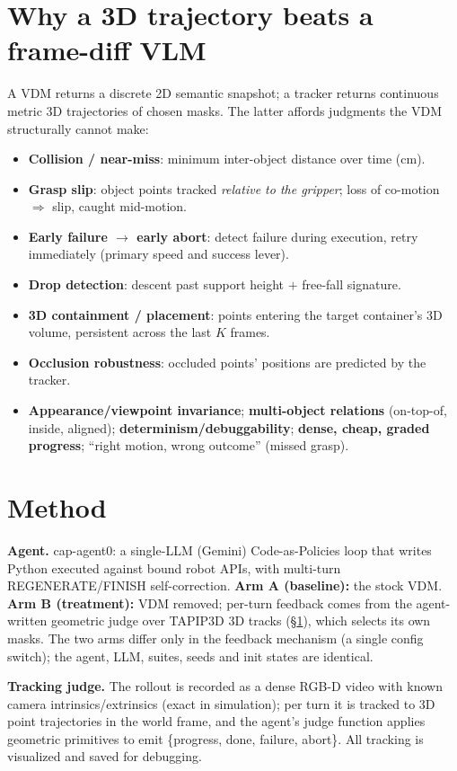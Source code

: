 \documentclass[11pt]{article}
\begin{document}
\section{Why a 3D trajectory beats a frame-diff VLM}
\label{sec:why}
A VDM returns a discrete 2D semantic snapshot; a tracker returns continuous metric 3D
trajectories of chosen masks. The latter affords judgments the VDM structurally cannot make:
\begin{itemize}\itemsep2pt
  \item \textbf{Collision / near-miss}: minimum inter-object distance over time (cm).
  \item \textbf{Grasp slip}: object points tracked \emph{relative to the gripper}; loss of
        co-motion $\Rightarrow$ slip, caught mid-motion.
  \item \textbf{Early failure $\to$ early abort}: detect failure during execution, retry
        immediately (primary speed and success lever).
  \item \textbf{Drop detection}: descent past support height $+$ free-fall signature.
  \item \textbf{3D containment / placement}: points entering the target container's 3D volume,
        persistent across the last $K$ frames.
  \item \textbf{Occlusion robustness}: occluded points' positions are predicted by the tracker.
  \item \textbf{Appearance/viewpoint invariance}; \textbf{multi-object relations}
        (on-top-of, inside, aligned); \textbf{determinism/debuggability};
        \textbf{dense, cheap, graded progress}; ``right motion, wrong outcome'' (missed grasp).
\end{itemize}

\section{Method}
\textbf{Agent.} cap-agent0: a single-LLM (Gemini) Code-as-Policies loop that writes Python
executed against bound robot APIs, with multi-turn REGENERATE/FINISH self-correction.
\textbf{Arm A (baseline):} the stock VDM. \textbf{Arm B (treatment):} VDM removed; per-turn
feedback comes from the agent-written geometric judge over TAPIP3D 3D tracks (\S\ref{sec:why}),
which selects its own masks. The two arms differ only in the feedback mechanism (a single
config switch); the agent, LLM, suites, seeds and init states are identical.

\textbf{Tracking judge.} The rollout is recorded as a dense RGB-D video with known camera
intrinsics/extrinsics (exact in simulation); per turn it is tracked to 3D point trajectories in
the world frame, and the agent's judge function applies geometric primitives to emit
\{progress, done, failure, abort\}. All tracking is visualized and saved for debugging.
\end{document}
